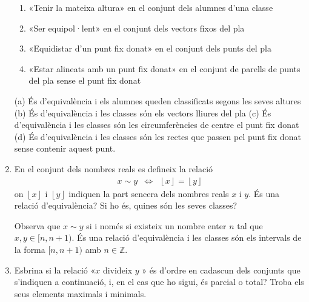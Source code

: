 \begin{enumerate}
\begin{exercici}
\begin{enumerate}
\item[a)] «Tenir la mateixa altura» en el
conjunt dels alumnes d'una classe

\item[b)] «Ser equipol·lent» en el conjunt dels vectors fixos del pla

\item[c)] «Equidistar d'un punt fix
donat» en el conjunt dels punts del pla

\item[d)] «Estar alineats amb un punt fix
donat» en el conjunt de parells de punts del pla sense el
punt fix donat
\end{enumerate}
\end{exercici}

\begin{indicacio}
(a) És d'equivalència i els alumnes queden classificats
segons les seves altures (b) És d'equivalència i les classes són
els vectors lliures del pla (c) És d'equivalència i les classes són les circumferències de centre el punt fix donat (d) És
d'equivalència i les classes són les rectes que passen pel punt fix
donat sense contenir aquest punt.
\end{indicacio}

\item
\begin{exercici}
En el conjunt dels nombres reals es defineix la relació%
\begin{equation*}
\begin{array}{ccc}
x\sim y & \Longleftrightarrow & \left\lfloor x\right\rfloor =\left\lfloor
y\right\rfloor%
\end{array}%
\end{equation*}%
on $\left\lfloor x\right\rfloor$ i $\left\lfloor y\right\rfloor$ indiquen la part sencera dels nombres reals $x$ i $y$. És una relació d'equivalència? Si ho és, quines són
les seves classes?
\end{exercici}

\begin{indicacio}
Observa que $x\sim y$ si i només si existeix un nombre
enter $n$ tal que $x,y\in [ n,n+1)$. És una relació d'equivalència i les classes són els intervals de la forma $[n,n+1)$ amb $%
n\in \mathbb{Z}$.
\end{indicacio}

\item
\begin{exercici}
Esbrina si la relació «$x$ divideix $y$%
» és d'ordre en cadascun dels conjunts que s'indiquen
a continuació, i, en el cas que ho sigui, és parcial o total? Troba
els seus elements maximals i minimals.


\end{exercici}
\end{enumerate}
